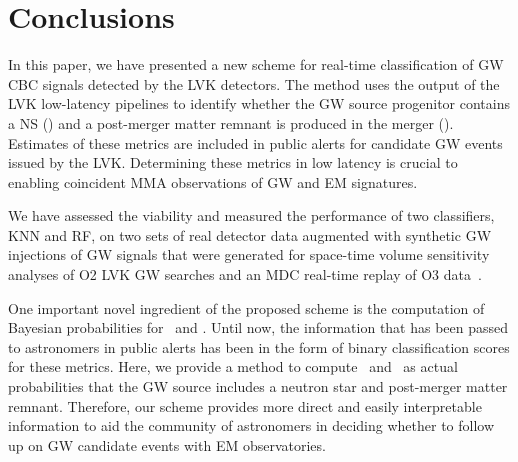 \section{Conclusions\label{conclusions}}


In this paper, we have presented a new scheme for real-time classification of \ac{GW} \ac{CBC} signals detected by the \ac{LVK} detectors. The method uses the
output of the \ac{LVK} low-latency pipelines to identify whether the GW source progenitor contains a \ac{NS} (\hasns) and a post-merger matter remnant is produced in the merger
(\hasrem). Estimates of these metrics are included in public alerts for candidate \ac{GW} events issued by the \ac{LVK}. Determining these metrics in low latency is crucial to
enabling coincident \ac{MMA} observations of GW and \ac{EM} signatures.

We have assessed the viability and measured the performance of two classifiers, \ac{KNN} and \ac{RF}, on two sets of real detector data augmented with synthetic GW injections of
GW signals that were generated for space-time volume sensitivity analyses of \ac{O2} \ac{LVK} \ac{GW} searches \cite{Chatterjee:2019avs} and an \ac{MDC} real-time
replay of \ac{O3} data~\cite{Chaudhary:2023vec}. 


One important novel ingredient of the proposed scheme is the computation of Bayesian probabilities for \hasns\ and \hasrem. Until now, the information that has been passed to
astronomers in public alerts has been in the form of binary classification scores for these metrics. Here, we provide a method to compute \hasns\ and \hasrem\ as actual
probabilities that the \ac{GW} source includes a neutron star and post-merger matter remnant. Therefore, our scheme provides more direct and easily interpretable information to aid the community
of astronomers in deciding whether to follow up on \ac{GW} candidate events with \ac{EM} observatories.


